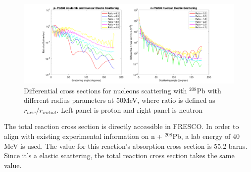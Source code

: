 \documentclass[12pt]{article}
\begin{document}
	
	\begin{figure}[t]
	\centering
	\includegraphics[width=1.0\textwidth]{7.png}
	\caption{Differential cross sections for nucleons scattering with $^{208}$Pb with different radius parameters at 50MeV, where ratio is defined as $r_{new}/r_{initial}$. Left panel is proton and right panel is neutron  }
	\label{fig:radiusparameter}
	\end{figure}
	
	The total reaction cross section is directly accessible in FRESCO. In order to align with existing experimental information on n + $^{208}$Pb, a lab energy of 40 MeV is used. The value for this reaction's absorption cross section is 55.2 barns. Since it's a elastic scattering, the total reaction cross section takes the same value.
	
\FloatBarrier



\end{document}
